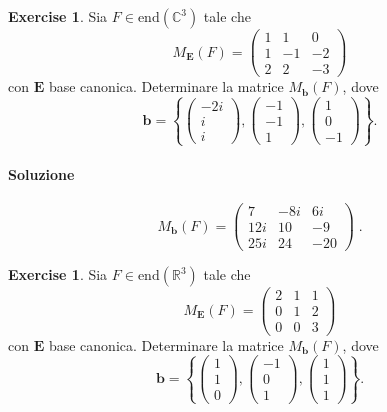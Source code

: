 \documentclass{article}
\theoremstyle{plain}
\theoremstyle{definition}
\newtheorem{xca}[exmp]{Exercise}
\theoremstyle{remark}
\begin{document}
\begin{bxthm}
\begin{xca}
    Sia $F\in\mathrm{end}(\mathbb{C}^3)$ tale che 
    \[M_\mathbf{E}(F)=
    \begin{pmatrix}
        1&1&0\\
        1&-1&-2\\
        2&2&-3
    \end{pmatrix}\]
    con $\mathbf{E}$ base canonica. Determinare la matrice $M_\mathbf{b}(F)$, dove
    \[\mathbf{b}=\left\{\begin{pmatrix}-2i\\i\\i\end{pmatrix},\begin{pmatrix}-1\\-1\\1\end{pmatrix},\begin{pmatrix}1\\0\\-1\end{pmatrix}\right\}.\]
\end{xca}
\end{bxthm}
\paragraph{Soluzione}
\[M_\mathbf{b}(F)=
\begin{pmatrix}
    7&-8i&6i\\
    12i&10&-9\\
    25i&24&-20
\end{pmatrix}\;.\]

\vspace{10pt}

\begin{bxthm}
\begin{xca}
    Sia $F\in\mathrm{end}(\mathbb{R}^3)$ tale che 
    \[M_\mathbf{E}(F)=
    \begin{pmatrix}
        2&1&1\\
        0&1&2\\
        0&0&3
    \end{pmatrix}\]
    con $\mathbf{E}$ base canonica. Determinare la matrice $M_\mathbf{b}(F)$, dove
    \[\mathbf{b}=\left\{\begin{pmatrix}1\\1\\0\end{pmatrix},\begin{pmatrix}-1\\0\\1\end{pmatrix},\begin{pmatrix}1\\1\\1\end{pmatrix}\right\}.\]
\end{xca}
\end{bxthm}
\end{document}
